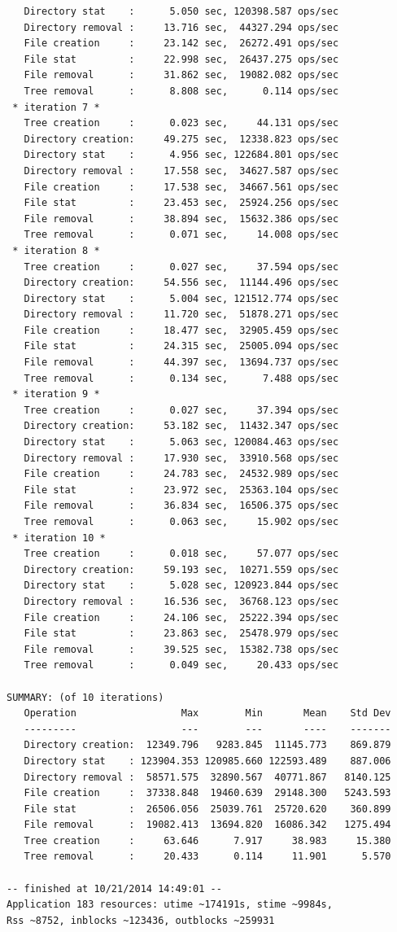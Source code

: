 \documentclass[conference,compsoc]{IEEEtran}
\begin{document}
\begin{lstlisting}
   Directory stat    :      5.050 sec, 120398.587 ops/sec
   Directory removal :     13.716 sec,  44327.294 ops/sec
   File creation     :     23.142 sec,  26272.491 ops/sec
   File stat         :     22.998 sec,  26437.275 ops/sec
   File removal      :     31.862 sec,  19082.082 ops/sec
   Tree removal      :      8.808 sec,      0.114 ops/sec
 * iteration 7 *
   Tree creation     :      0.023 sec,     44.131 ops/sec
   Directory creation:     49.275 sec,  12338.823 ops/sec
   Directory stat    :      4.956 sec, 122684.801 ops/sec
   Directory removal :     17.558 sec,  34627.587 ops/sec
   File creation     :     17.538 sec,  34667.561 ops/sec
   File stat         :     23.453 sec,  25924.256 ops/sec
   File removal      :     38.894 sec,  15632.386 ops/sec
   Tree removal      :      0.071 sec,     14.008 ops/sec
 * iteration 8 *
   Tree creation     :      0.027 sec,     37.594 ops/sec
   Directory creation:     54.556 sec,  11144.496 ops/sec
   Directory stat    :      5.004 sec, 121512.774 ops/sec
   Directory removal :     11.720 sec,  51878.271 ops/sec
   File creation     :     18.477 sec,  32905.459 ops/sec
   File stat         :     24.315 sec,  25005.094 ops/sec
   File removal      :     44.397 sec,  13694.737 ops/sec
   Tree removal      :      0.134 sec,      7.488 ops/sec
 * iteration 9 *
   Tree creation     :      0.027 sec,     37.394 ops/sec
   Directory creation:     53.182 sec,  11432.347 ops/sec
   Directory stat    :      5.063 sec, 120084.463 ops/sec
   Directory removal :     17.930 sec,  33910.568 ops/sec
   File creation     :     24.783 sec,  24532.989 ops/sec
   File stat         :     23.972 sec,  25363.104 ops/sec
   File removal      :     36.834 sec,  16506.375 ops/sec
   Tree removal      :      0.063 sec,     15.902 ops/sec
 * iteration 10 *
   Tree creation     :      0.018 sec,     57.077 ops/sec
   Directory creation:     59.193 sec,  10271.559 ops/sec
   Directory stat    :      5.028 sec, 120923.844 ops/sec
   Directory removal :     16.536 sec,  36768.123 ops/sec
   File creation     :     24.106 sec,  25222.394 ops/sec
   File stat         :     23.863 sec,  25478.979 ops/sec
   File removal      :     39.525 sec,  15382.738 ops/sec
   Tree removal      :      0.049 sec,     20.433 ops/sec

SUMMARY: (of 10 iterations)
   Operation                  Max        Min       Mean    Std Dev
   ---------                  ---        ---       ----    -------
   Directory creation:  12349.796   9283.845  11145.773    869.879
   Directory stat    : 123904.353 120985.660 122593.489    887.006
   Directory removal :  58571.575  32890.567  40771.867   8140.125
   File creation     :  37338.848  19460.639  29148.300   5243.593
   File stat         :  26506.056  25039.761  25720.620    360.899
   File removal      :  19082.413  13694.820  16086.342   1275.494
   Tree creation     :     63.646      7.917     38.983     15.380
   Tree removal      :     20.433      0.114     11.901      5.570

-- finished at 10/21/2014 14:49:01 --
Application 183 resources: utime ~174191s, stime ~9984s, 
Rss ~8752, inblocks ~123436, outblocks ~259931
\end{lstlisting}
\end{document}
